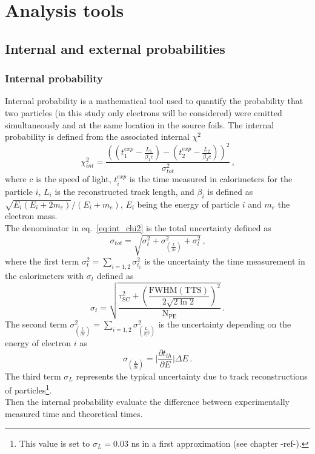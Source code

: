 \chapter{Analysis tools}

\section{Internal and external probabilities}
\subsection{Internal probability}
\label{subsec:internal_prob}
Internal probability is a mathematical tool used to quantify the probability that two particles (in this study only electrons will be considered) were emitted simultaneously and at the same location in the source foils.
The internal probability is defined from the associated internal $\chi^{2}$
\begin{equation}
  \chi^{2}_{int}=\frac{((t^{exp}_{1} - \frac{L_{1}}{\beta_{1} c}) - (t^{exp}_{2} - \frac{L_{2}}{\beta_{2} c}))^{2}}{\sigma_{tot}^{2}}\,\text{,}
  \label{eq:int_chi2}
\end{equation}
where c is the speed of light, $t^{exp}_{i}$ is the time measured in calorimeters for the particle $i$, $L_{i}$ is the reconstructed track length, and $\beta_{i}$ is defined as $\sqrt{E_{i}(E_{i} + 2m_{e})} / (E_{i} + m_{e})$, $E_{i}$ being the energy of particle $i$ and $m_{e}$ the electron mass.\\
The denominator in eq.~\ref{eq:int_chi2} is the total uncertainty defined as
\begin{equation}
  \sigma_{tot}=\sqrt{\sigma_{t}^{2}+\sigma_{\left(\frac{L}{\beta c}\right)}^{2}+\sigma_{l}^{2}}\,\text{,}
  \label{eq:sigma_tot}
\end{equation}
where the first term $\sigma^{2}_{t}=\sum_{i=1,2}\sigma^{2}_{t_{i}}$ is the uncertainty the time measurement in the calorimeters with $\sigma_{t}$ defined as
\begin{equation}
  \sigma_{t}=\sqrt{\dfrac{\tau_{\text{SC}}^{2}+\left(\dfrac{\text{FWHM}(\text{TTS})}{2\sqrt{2\ln{2}}}\right)^{2}}{\text{N}_\text{PE}}}\,\text{.}
  \label{eq:sigma_t}
\end{equation}
The second term $\sigma^{2}_{\left(\frac{L}{\beta c}\right)}=\sum_{i=1,2}\sigma^{2}_{\left(\frac{L_{i}}{\beta_{i}c}\right)}$ is the uncertainty depending on the energy of electron $i$ as
\begin{equation}
\sigma_{\left(\frac{L}{\beta c}\right)} = \biggl\lvert \dfrac{\partial t_{th}}{\partial E}  \biggr\rvert \Delta E\,\text{.}
  \label{eq:sigma_L}
\end{equation}
The third term $\sigma_{L}$ represents the typical uncertainty due to track reconstructions of particles\footnote{This value is set to $\sigma_{L}=0.03$ ns in a first approximation (see chapter -ref-).}.\\
Then the internal probability evaluate the difference between experimentally measured time and theoretical times.

